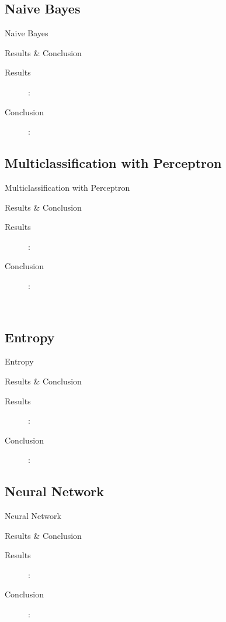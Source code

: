 \documentclass{beamer}
\begin{document}
\subsection{Naive Bayes}
\begin{frame}{Naive Bayes}
\end{frame}
\begin{frame}{Results \& Conclusion}
\begin{description}
\item[Results]:
\item[Conclusion]:
\end{description}
\end{frame}

\subsection{Multiclassification with Perceptron}
\begin{frame}{Multiclassification with Perceptron}
\end{frame}
\begin{frame}{Results \& Conclusion}
\begin{description}
\item[Results]: 
\item[Conclusion]:
\end{description}
\end{frame}
\
\subsection{Entropy}
\begin{frame}{Entropy}
\end{frame}
\begin{frame}{Results \& Conclusion}
\begin{description}
\item[Results]: 
\item[Conclusion]:
\end{description}
\end{frame}

\subsection{Neural Network}
\begin{frame}{Neural Network}
\end{frame}
\begin{frame}{Results \& Conclusion}
\begin{description}
\item[Results]: 
\item[Conclusion]: 
\end{description}
\end{frame}
\end{document}
